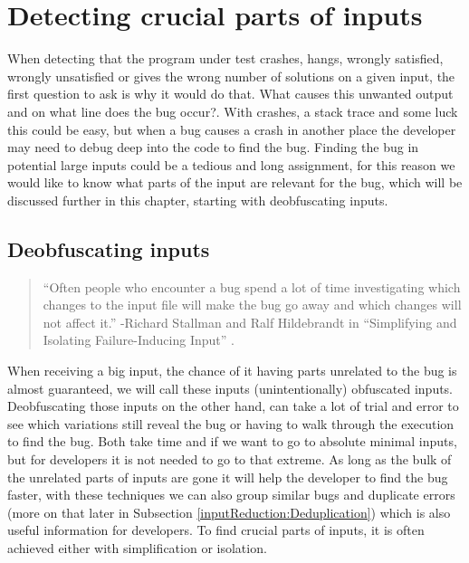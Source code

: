 \chapter{Detecting crucial parts of inputs}
\label{cha:4:crucialParts}
\label{inputReduction:intro}
When detecting that the program under test crashes, hangs, wrongly satisfied, wrongly unsatisfied or gives the wrong number of solutions on a given input, the first question to ask is why it would do that. What causes this unwanted output and on what line does the bug occur?. 
With crashes, a stack trace and some luck this could be easy, but when a bug causes a crash in another place the developer may need to debug deep into the code to find the bug. 
Finding the bug in potential large inputs could be a tedious and long assignment, for this reason we would like to know what parts of the input are relevant for the bug, which will be discussed further in this chapter, starting with deobfuscating inputs.


\section{Deobfuscating inputs}
\label{inputReduction:Deobfuscating}
\begin{quote}
	“Often people who encounter a bug spend a lot of time investigating which changes to the input file will make the bug go away and which changes will not affect it.” 
	\newline
	-Richard Stallman and Ralf Hildebrandt in “Simplifying and Isolating Failure-Inducing Input” \cite{5zeller2002simplifyingIsolatingFailure-inducing}.
\end{quote} 
When receiving a big input, the chance of it having parts unrelated to the bug is almost guaranteed, we will call these inputs (unintentionally) obfuscated inputs. Deobfuscating those inputs on the other hand, can take a lot of trial and error to see which variations still reveal the bug or having to walk through the execution to find the bug. Both take time and if we want to go to absolute minimal inputs, but for developers it is not needed to go to that extreme. As long as the bulk of the unrelated parts of inputs are gone it will help the developer to find the bug faster, with these techniques we can also group similar bugs and duplicate errors (more on that later in Subsection \ref{inputReduction:Deduplication}) which is also useful information for developers. To find crucial parts of inputs, it is often achieved either with simplification or isolation. 

